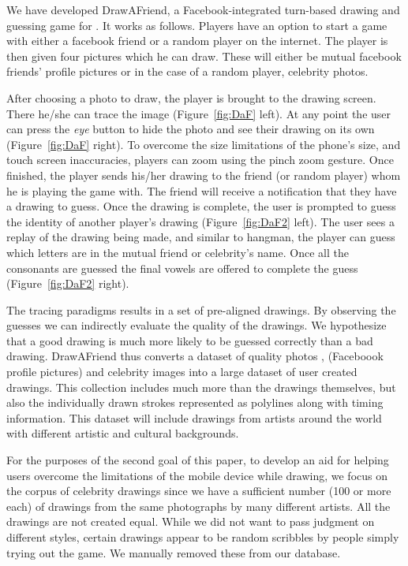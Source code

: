 We have developed DrawAFriend, a Facebook-integrated turn-based drawing and guessing game for .  It works as follows. Players have an option to start a game with either a facebook friend or a random player on the internet. The player is then given four pictures which he can draw. These will either be mutual facebook friends' profile pictures or in the case of a random player, celebrity photos.

After choosing a photo to draw, the player is brought to the drawing screen. There he/she can trace the image (Figure~\ref{fig:DaF} left). At any point the user can press the {\em eye} button to hide the photo and see their drawing on its own (Figure~\ref{fig:DaF} right). To overcome the size limitations of the phone's size, and touch screen inaccuracies, players can zoom using the pinch zoom gesture.
Once finished, the player sends his/her drawing to the friend (or random player) whom he is playing the game with. The friend will receive a notification that they have a drawing to guess. Once the drawing is complete, the user is prompted to guess the identity of another player's drawing (Figure~\ref{fig:DaF2} left). The user sees a replay of the drawing being made, and similar to hangman, the player can guess which letters are in the mutual friend or celebrity's name. Once all the consonants are guessed the final vowels are offered to complete the guess (Figure~\ref{fig:DaF2} right).

The tracing paradigms results in a set of pre-aligned drawings. By observing the guesses we can indirectly evaluate the quality of the drawings. We hypothesize that a good drawing is much more likely to be guessed correctly than a bad drawing. DrawAFriend thus converts a dataset of quality photos , (Faceboook profile pictures) and celebrity images into a large dataset of user created drawings. This collection includes much more than the drawings themselves, but also the individually drawn strokes represented as polylines along with timing information. This dataset will include drawings from artists around the world with different artistic and cultural backgrounds.

For the purposes of the second goal of this paper, to develop an aid for helping users overcome the limitations of the mobile device while drawing, we focus on the corpus of celebrity drawings since we have a sufficient number (100 or more each) of drawings from the same photographs by many different artists. All the drawings are not created equal. While we did not want to pass judgment on different styles, certain drawings appear to be random scribbles by people simply trying out the game. We manually removed these from our database. 

